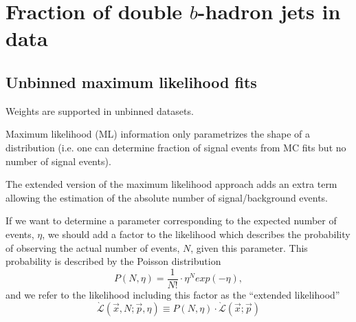 %
%
\chapter{Fraction of double $b$-hadron jets in data}\label{ch:gbbfraction}

\section{Unbinned maximum likelihood fits}\label{sec:LLFits}

Weights are supported in unbinned datasets. %



Maximum likelihood (ML) information only parametrizes the shape of a 
distribution (i.e. one can determine fraction of signal events from 
MC fits but no number of signal events).


The extended version of the maximum likelihood approach adds an extra term
allowing the estimation of the absolute number of signal/background events.


If we want to  determine a parameter corresponding to the expected number of
events, $\eta$, we should add a factor to the likelihood which describes the probability of observing the actual number of events, $N$, given this parameter. This probability is described by the Poisson distribution
%
\begin{equation}
P(N,\eta) = \frac{1}{N!} \cdot \eta^N exp(-\eta),
\end{equation}
%
and we refer to the likelihood including this factor as the ``extended likelihood''
%
\begin{equation}
\grave{\mathcal{L}}(\vec{x},N;\vec{p},\eta) \equiv P(N,\eta) \cdot \grave{\mathcal{L}}(\vec{x};\vec{p})
\end{equation}
%

